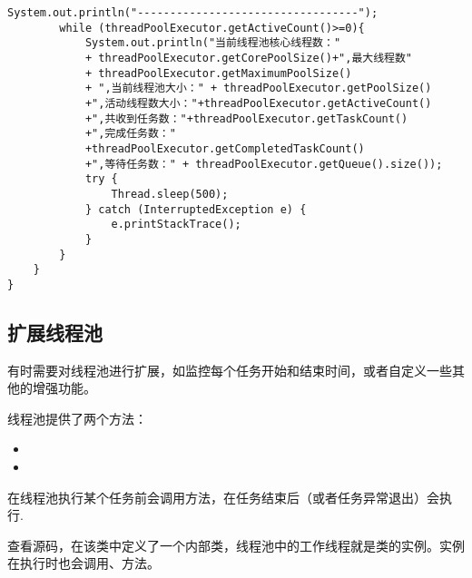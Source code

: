 \documentclass[a4paper]{report}
\begin{document}
\begin{Verbatim}[frame=single,numbersep=5pt,xleftmargin=1.5em,xrightmargin=1.5em]
        System.out.println("----------------------------------");
        while (threadPoolExecutor.getActiveCount()>=0){
            System.out.println("当前线程池核心线程数："
            + threadPoolExecutor.getCorePoolSize()+",最大线程数"
            + threadPoolExecutor.getMaximumPoolSize()
            + ",当前线程池大小：" + threadPoolExecutor.getPoolSize()
            +",活动线程数大小："+threadPoolExecutor.getActiveCount()
            +",共收到任务数："+threadPoolExecutor.getTaskCount()
            +",完成任务数："
            +threadPoolExecutor.getCompletedTaskCount()
            +",等待任务数：" + threadPoolExecutor.getQueue().size());
            try {
                Thread.sleep(500);
            } catch (InterruptedException e) {
                e.printStackTrace();
            }
        }
    }
}\end{Verbatim}
\subsection{扩展线程池}
有时需要对线程池进行扩展，如监控每个任务开始和结束时间，或者自定义一些其他的增强功能。

线程池提供了两个方法：
\begin{itemize}
  \item {}
  \item {}
\end{itemize}

在线程池执行某个任务前会调用方法，在任务结束后（或者任务异常退出）会执行.

查看源码，在该类中定义了一个内部类，线程池中的工作线程就是类的实例。实例在执行时也会调用、方法。
\end{document}
